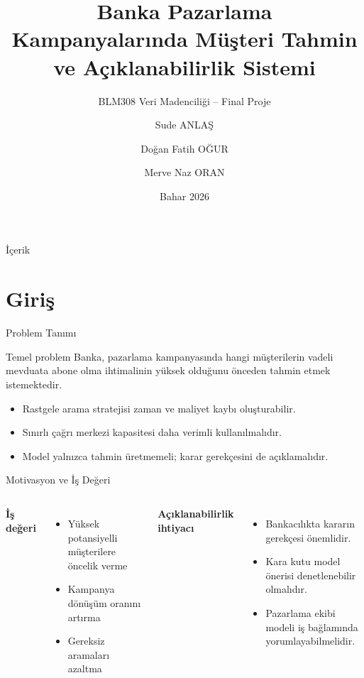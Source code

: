 \documentclass[aspectratio=169]{beamer}
\title{Banka Pazarlama Kampanyalarında Müşteri Tahmin ve Açıklanabilirlik Sistemi}
\subtitle{BLM308 Veri Madenciliği -- Final Proje}
\author{Sude ANLAŞ \and Doğan Fatih OĞUR \and Merve Naz ORAN}
\institute{Gedik Üniversitesi -- Bilgisayar Mühendisliği}
\date{Bahar 2026}
\begin{document}
\begin{frame}
    \titlepage
\end{frame}

\begin{frame}{İçerik}
    \tableofcontents
\end{frame}

\section{Giriş}

\begin{frame}{Problem Tanımı}
    \begin{block}{Temel problem}
        Banka, pazarlama kampanyasında hangi müşterilerin vadeli mevduata abone olma ihtimalinin yüksek olduğunu önceden tahmin etmek istemektedir.
    \end{block}

    \begin{itemize}
        \item Rastgele arama stratejisi zaman ve maliyet kaybı oluşturabilir.
        \item Sınırlı çağrı merkezi kapasitesi daha verimli kullanılmalıdır.
        \item Model yalnızca tahmin üretmemeli; karar gerekçesini de açıklamalıdır.
    \end{itemize}
\end{frame}

\begin{frame}{Motivasyon ve İş Değeri}
    \begin{columns}[T]
        \textbf{İş değeri}
        \begin{itemize}
            \item Yüksek potansiyelli müşterilere öncelik verme
            \item Kampanya dönüşüm oranını artırma
            \item Gereksiz aramaları azaltma
        \end{itemize}

        \textbf{Açıklanabilirlik ihtiyacı}
        \begin{itemize}
            \item Bankacılıkta kararın gerekçesi önemlidir.
            \item Kara kutu model önerisi denetlenebilir olmalıdır.
            \item Pazarlama ekibi modeli iş bağlamında yorumlayabilmelidir.
        \end{itemize}
    \end{columns}
\end{frame}
\end{document}
